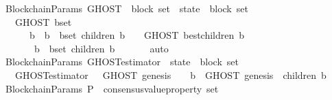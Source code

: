 \begin{isabellebody}
\isanewline
\isanewline
\isanewline
{}\isamarkupfalse%
\ {\isacharparenleft}\ BlockchainParams{\isacharparenright}\ GHOST\ {\isacharcolon}{\isacharcolon}\ {\isachardoublequoteopen}{\isacharparenleft}block\ set\ {\isacharasterisk}\ state{\isacharparenright}\ {\isacharequal}{\isachargreater}\ block\ set{\isachardoublequoteclose}\isanewline
\ \ \isanewline
\ \ \ \ {\isachardoublequoteopen}GHOST\ {\isacharparenleft}b{\isacharunderscore}set{\isacharcomma}\ {\isasymsigma}{\isacharparenright}\ {\isacharequal}\isanewline
\ \ \ \ \ \ {\isacharparenleft}{\isasymUnion}\ b\ {\isasymin}\ {\isacharbraceleft}b\ {\isasymin}\ b{\isacharunderscore}set{\isachardot}\ children\ {\isacharparenleft}b{\isacharcomma}\ {\isasymsigma}{\isacharparenright}\ {\isasymnoteq}\ {\isasymemptyset}{\isacharbraceright}{\isachardot}\ GHOST\ {\isacharparenleft}best{\isacharunderscore}children\ {\isacharparenleft}b{\isacharcomma}\ {\isasymsigma}{\isacharparenright}{\isacharcomma}\ {\isasymsigma}{\isacharparenright}{\isacharparenright}\isanewline
\ \ \ \ \ \ \ {\isasymunion}\ {\isacharbraceleft}b\ {\isasymin}\ b{\isacharunderscore}set{\isachardot}\ children\ {\isacharparenleft}b{\isacharcomma}\ {\isasymsigma}{\isacharparenright}\ {\isacharequal}\ {\isasymemptyset}{\isacharbraceright}{\isachardoublequoteclose}\isanewline
%
\isadelimproof
\ \ %
\endisadelimproof
%
\isatagproof
{}\isamarkupfalse%
\ auto%
\endisatagproof
{\isafoldproof}%
%
\isadelimproof
\isanewline
%
\endisadelimproof
\isanewline
\isanewline
{}\isamarkupfalse%
\ {\isacharparenleft}\ BlockchainParams{\isacharparenright}\ GHOST{\isacharunderscore}estimator\ {\isacharcolon}{\isacharcolon}\ {\isachardoublequoteopen}state\ {\isasymRightarrow}\ block\ set{\isachardoublequoteclose}\isanewline
\ \ \isanewline
\ \ \ \ {\isachardoublequoteopen}GHOST{\isacharunderscore}estimator\ {\isasymsigma}\ {\isacharequal}\ GHOST\ {\isacharparenleft}{\isacharbraceleft}genesis{\isacharbraceright}{\isacharcomma}\ {\isasymsigma}{\isacharparenright}\ {\isasymunion}\ {\isacharparenleft}{\isasymUnion}\ b\ {\isasymin}\ GHOST\ {\isacharparenleft}{\isacharbraceleft}genesis{\isacharbraceright}{\isacharcomma}\ {\isasymsigma}{\isacharparenright}{\isachardot}\ children\ {\isacharparenleft}b{\isacharcomma}\ {\isasymsigma}{\isacharparenright}{\isacharparenright}{\isachardoublequoteclose}\isanewline
\isanewline
\isanewline
{}\isamarkupfalse%
\ {\isacharparenleft}\ BlockchainParams{\isacharparenright}\ P\ {\isacharcolon}{\isacharcolon}\ {\isachardoublequoteopen}consensus{\isacharunderscore}value{\isacharunderscore}property\ set{\isachardoublequoteclose}\isanewline

\end{isabellebody}
